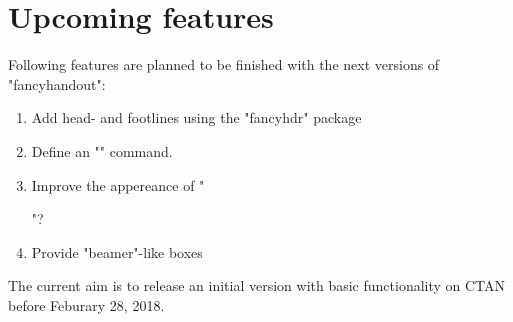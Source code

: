 \documentclass[11pt]{ltxdoc}
\begin{document}
	\section{Upcoming features}
	Following features are planned to be finished with the next versions of "fancyhandout":
	\begin{enumerate}
		\item
			Add head- and footlines using the "fancyhdr" package
		
		\item
			Define an "\institute" command.
		
		\item
			Improve the appereance of "\maketitle"?
		
		\item
			Provide "beamer"-like boxes
	\end{enumerate}
	
	The current aim is to release an initial version with basic functionality on CTAN before Feburary 28, 2018.
\end{document}
